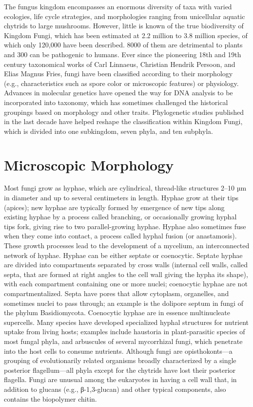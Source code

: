 \documentclass[]{book}
\begin{document}
The fungus kingdom encompasses an enormous diversity of taxa with varied ecologies, life cycle strategies, and morphologies ranging from unicellular aquatic chytrids to large mushrooms. However, little is known of the true biodiversity of Kingdom Fungi, which has been estimated at 2.2 million to 3.8 million species, of which only 120,000 have been described. 8000 of them are detrimental to plants and 300 can be pathogenic to humans. Ever since the pioneering 18th and 19th century taxonomical works of Carl Linnaeus, Christian Hendrik Persoon, and Elias Magnus Fries, fungi have been classified according to their morphology (e.g., characteristics such as spore color or microscopic features) or physiology. Advances in molecular genetics have opened the way for DNA analysis to be incorporated into taxonomy, which has sometimes challenged the historical groupings based on morphology and other traits. Phylogenetic studies published in the last decade have helped reshape the classification within Kingdom Fungi, which is divided into one subkingdom, seven phyla, and ten subphyla.

\hypertarget{microscopic-morphology}{%
\section{Microscopic Morphology}\label{microscopic-morphology}}

Most fungi grow as hyphae, which are cylindrical, thread-like structures 2--10 µm in diameter and up to several centimeters in length. Hyphae grow at their tips (apices); new hyphae are typically formed by emergence of new tips along existing hyphae by a process called branching, or occasionally growing hyphal tips fork, giving rise to two parallel-growing hyphae. Hyphae also sometimes fuse when they come into contact, a process called hyphal fusion (or anastamosis). These growth processes lead to the development of a mycelium, an interconnected network of hyphae. Hyphae can be either septate or coenocytic. Septate hyphae are divided into compartments separated by cross walls (internal cell walls, called septa, that are formed at right angles to the cell wall giving the hypha its shape), with each compartment containing one or more nuclei; coenocytic hyphae are not compartmentalized. Septa have pores that allow cytoplasm, organelles, and sometimes nuclei to pass through; an example is the dolipore septum in fungi of the phylum Basidiomycota. Coenocytic hyphae are in essence multinucleate supercells.
Many species have developed specialized hyphal structures for nutrient uptake from living hosts; examples include haustoria in plant-parasitic species of most fungal phyla, and arbuscules of several mycorrhizal fungi, which penetrate into the host cells to consume nutrients.
Although fungi are opisthokonts---a grouping of evolutionarily related organisms broadly characterized by a single posterior flagellum---all phyla except for the chytrids have lost their posterior flagella. Fungi are unusual among the eukaryotes in having a cell wall that, in addition to glucans (e.g., β-1,3-glucan) and other typical components, also contains the biopolymer chitin.
\end{document}
